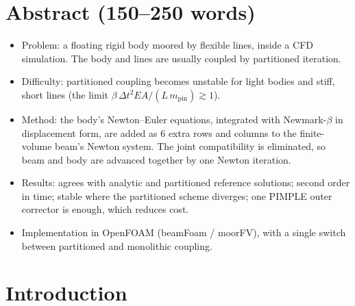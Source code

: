 \documentclass[11pt,a4paper]{article}
\newcommand{\dt}{\Delta t}
\begin{document}
\section*{Abstract (150--250 words)}

\begin{itemize}
  \item Problem: a floating rigid body moored by flexible lines, inside a CFD
        simulation. The body and lines are usually coupled by partitioned
        iteration.
  \item Difficulty: partitioned coupling becomes unstable for light bodies and
        stiff, short lines (the limit
        $\beta\,\dt^2 EA/(L\,m_\mathrm{pin}) \gtrsim 1$).
  \item Method: the body's Newton--Euler equations, integrated with
        Newmark-$\beta$ in displacement form, are added as 6 extra rows and
        columns to the finite-volume beam's Newton system. The joint
        compatibility is eliminated, so beam and body are advanced together
        by one Newton iteration.
  \item Results: agrees with analytic and partitioned reference solutions;
        second order in time; stable where the partitioned scheme diverges;
        one PIMPLE outer corrector is enough, which reduces cost.
  \item Implementation in OpenFOAM (beamFoam / moorFV), with a single switch
        between partitioned and monolithic coupling.
\end{itemize}

\section{Introduction}
\end{document}
